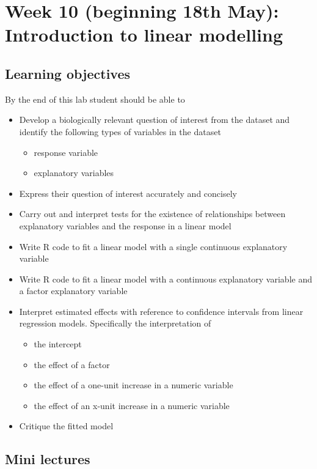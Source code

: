 \documentclass{article}
\begin{document}
\newpage

\section*{Week 10 (beginning 18th May): Introduction to linear modelling}
\subsection*{Learning objectives}
By the end of this lab student should be able to
\begin{itemize}
\item Develop a biologically relevant question of interest  from the dataset and identify the following types of variables in the dataset
  \begin{itemize}
  \item response variable
  \item explanatory variables
  \end{itemize}
\item Express their question of interest accurately and concisely
\item Carry out and interpret tests for the existence of relationships between explanatory variables and the response in a linear model
\item Write R code to fit a linear model with a single continuous explanatory variable
\item Write R code to fit a linear model with a continuous explanatory variable and a factor explanatory variable
\item Interpret estimated effects with reference to confidence intervals from linear regression models. Specifically the interpretation of
  \begin{itemize}
  \item the intercept
  \item the effect of a factor
  \item the effect of a one-unit increase in a numeric variable
  \item the effect of an x-unit increase in a numeric variable
  \end{itemize}
\item Critique the fitted model
\end{itemize}

\subsection*{Mini lectures}
\end{document}
